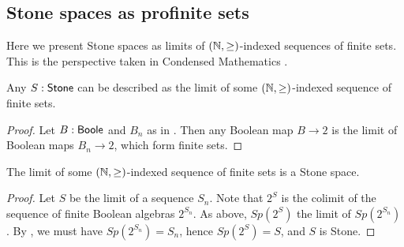 
\subsection{Stone spaces as profinite sets}
Here we present Stone spaces as limits of $(\mathbb{N},\geq)$-indexed sequences of finite sets. 
This is the perspective taken in Condensed Mathematics \cite{Condensed,Dagur,Scholze}.
\begin{lemma}
  Any $S:\mathsf{Stone}$ can be described as the limit of some $(\mathbb{N},\geq)$-indexed sequence of 
  finite sets. 
\end{lemma}
\begin{proof}
  Let $B:\mathsf{Boole}$ and $B_n$ as in . 
  Then any Boolean map $B\to 2$ is the limit of Boolean maps $B_n \to 2$, 
  which form finite sets.
\end{proof}
\begin{lemma}
  The limit of some $(\mathbb{N},\geq)$-indexed sequence of finite sets is a Stone space. 
\end{lemma}
\begin{proof}
  Let $S$ be the limit of a sequence $S_n$. 
  Note that $2^S$ is the colimit of the sequence of finite Boolean algebras $2^{S_n}$.
  As above, $Sp(2^S)$ the limit of $Sp(2^{S_n})$.
  By , we must have $Sp(2^{S_n}) = S_n$, hence $Sp(2^S) = S$, 
  and $S$ is Stone. 
\end{proof}


